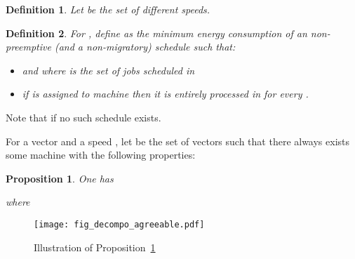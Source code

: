 \documentclass[11pt,a4paper]{article}
\newtheorem{prop}{Proposition}
\newtheorem{definition}{Definition}
\begin{document}
\begin{definition}\label{def:Delta}
Let  
be the set of different speeds.
\end{definition}





\begin{definition}\label{def:Fktw}
For , define  as the minimum energy consumption 
of an non-preemptive (and a non-migratory) schedule  such that:
\begin{itemize}
\item  and 
	where  is the set of jobs scheduled in 
\item if  is assigned to machine  then it is entirely processed in 
	  for every .
\end{itemize}
\end{definition}
Note that  if no such schedule 
exists. 







For a vector  and a speed ,
let  be the set of vectors
 such that there always exists some machine 
 with the following properties:


\begin{prop}\label{prop_F}
One has

where 

\end{prop}


\begin{figure}[ht]
\begin{center}
\texttt{[image: fig\_decompo\_agreeable.pdf]}
\end{center}
\caption{Illustration of Proposition~\ref{prop_F}}
\label{fig_F}
\end{figure}
\end{document}
